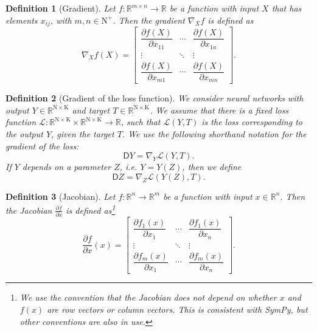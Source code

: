 \documentclass{article}
\newtheorem{definition}{Definition}
\newcommand{\const}[1]{\ensuremath{\mathrm{#1}}} %
\newcommand{\Gradient}{\textsf{D}}
\newcommand{\Reals}{\mathbb{R}}
\begin{document}
\begin{definition}[Gradient]
Let $f: \Reals^{m \times n} \rightarrow \Reals$ be a function with input $X$ that has elements $x_{ij}$, with $m, n \in \mathbb{\const{N}}^{+}$. Then the gradient $\nabla_X f$ is defined as
\begin{equation}
\nabla_X f(X) =
\begin{bmatrix}
 \dfrac{\partial f(X)}{\partial x_{11}} & \cdots & \dfrac {\partial f(X)}{\partial x_{1n}}
   \\
   \vdots & \ddots & \vdots \\
   \dfrac {\partial f(X)}{\partial x_{m1}} & \cdots & \dfrac {\partial f(X)}{\partial x_{mn}}
\end{bmatrix}.
\end{equation}
\end{definition}
\begin{definition}[Gradient of the loss function] \label{def:gradient}
We consider neural networks with output $Y \in \Reals^{\const{N} \times \const{K}}$ and target $T \in \Reals^{\const{N} \times \const{K}}$. We assume that there is a fixed loss function $\mathcal{L}: \Reals^{\const{N} \times \const{K}} \times \Reals^{\const{N} \times \const{K}} \rightarrow \Reals$, such that $\mathcal{L}(Y, T)$ is the loss corresponding to the output $Y$, given the target $T$. We use the following shorthand notation for the gradient of the loss:
\begin{equation}
\Gradient Y = \nabla_Y \mathcal{L}(Y, T).
\end{equation}
If $Y$ depends on a parameter $Z$, i.e. $Y = Y(Z)$, then we define
\begin{equation}
\Gradient Z = \nabla_Z \mathcal{L}(Y(Z), T).  
\end{equation}
\end{definition}

\begin{definition}[Jacobian]
Let $f: \Reals^n \rightarrow \Reals^m$ be a function with input $x \in \Reals^n$. Then the Jacobian $\frac{\partial f}{\partial x}$ is defined as\footnote{We use the convention that the Jacobian does not depend on whether $x$ and $f(x)$ are row vectors or column vectors. This is consistent with SymPy, but other conventions are also in use.}
\begin{equation}
\frac{\partial f}{\partial x}(x) =
\begin{bmatrix}
 \dfrac{\partial f_{1}(x)}{\partial x_{1}} & \cdots & \dfrac {\partial f_{1}(x)}{\partial x_{n}}
   \\
   \vdots & \ddots & \vdots \\
   \dfrac {\partial f_{m}(x)}{\partial x_{1}} & \cdots & \dfrac {\partial f_{m}(x)}{\partial x_{n}}
\end{bmatrix}.
\end{equation}
\end{definition}
\end{document}
